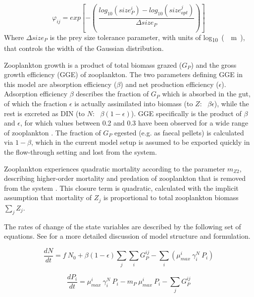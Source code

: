 \documentclass[journal abbreviation, manuscript]{copernicus}
\begin{document}
\begin{equation}
    \varphi_{ij} = exp \left[ -\left( \ \frac{ log_{10}(size_P^i) - log_{10}(size_{opt}^j) }{ \Delta size_{P} } \right) \right]
\end{equation}
Where $\Delta size_{P}$ is the prey size tolerance parameter, with units of \unit{log_{10}(\mu m)}, that controls the width of the Gaussian distribution.

Zooplankton growth is a product of total biomass grazed ($G_P$) and the gross growth efficiency (GGE) of zooplankton. The two parameters defining GGE in this model are absorption efficiency ($\beta$) and net production efficiency ($\epsilon$). Adsorption efficiency $\beta$ describes the fraction of $G_P$ which is absorbed in the gut, of which the fraction $\epsilon$ is actually assimilated into biomass (to $Z$: \ $\beta \epsilon$), while the rest is excreted as DIN (to $N$: \ $\beta (1-\epsilon)$). GGE specifically is the product of $\beta$ and $\epsilon$, for which values between 0.2 and 0.3 have been observed for a wide range of zooplankton  \citep{Straile1997GrossGroup}. The fraction of $G_P$ egested (e.g. as faecal pellets) is calculated via $1-\beta$, which in the current model setup is assumed to be exported quickly in the flow-through setting and lost from the system. 

Zooplankton experiences quadratic mortality according to the parameter $m_{Z2}$, describing higher-order mortality and predation of zooplankton that is removed from the system \citep{Edwards2000TheModels}. This closure term is quadratic, calculated with the implicit assumption that mortality of $Z_j$ is proportional to total zooplankton biomass $\sum_{j} Z_j$.


The rates of change of the state variables are described by the following set of equations. See \citet{Banas2011b} for a more detailed discussion of model structure and formulation.

\begin{equation}
    \frac{d N}{d t} = 
    f \ N_0 %
    +  \beta (1 - \epsilon) \sum_{j} \sum_{i} G_P^{ij} %
    - \sum_{i} ( \mu_{max}^i \ \gamma_i^N \ P_i) %
\end{equation}

\begin{equation}
    \frac{d P_i}{d t} =
    \mu_{max}^i \  \gamma_i^N \   P_i  %
    - m_P  \ \mu_{max}^i \ P_i %
    - \sum_{j} G_P^{ij} %
\end{equation}
\end{document}
